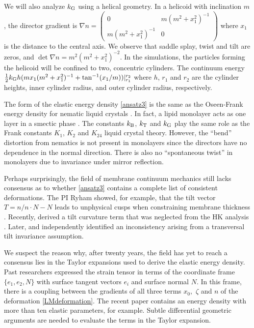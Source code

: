 We will also analyze $k_{\mathrm{G}}$ using a helical geometry. In a helicoid with inclination $m$, the director
gradient is $\nabla n = \begin{pmatrix} 0 & m(m^2+x_1^2)^{-1} \\ m(m^2+x_1^2)^{-1} & 0\end{pmatrix}$ where $x_1$ is the distance to the central
axis. We observe that saddle splay, twist and tilt are zeros, and $\det \nabla n = m^2(m^2+x_1^2)^{-2}$.
In the simulations, the particles forming the helicoid will be confined to two, concentric cylinders. The
continuum energy $\tfrac{1}{2}k_{\mathrm{G}} h(m x_1(m^2+x_1^2)^{-1} + \tan^{-1}(x_1/m)) |_{r_1}^{r_2}$ where $h$, $r_1$ and $r_2$
are the cylinder heights, inner cylinder radius, and outer cylinder radius, respectively. 

The form of the elastic energy density \eqref{ansatz3} is the same as
the Oseen-Frank energy density for nematic liquid crystals \cite{ANDRIENKO2018520,Tran7106}.  In fact,  
a lipid monolayer acts as one layer in a smectic  phase \cite{REYESMATEO1995978,Rangamani20140463,PhysRevLett.113.248102}. 
The constants $k_{\mathrm{B}}$, $k_{\mathrm{T}}$  and $k_{\mathrm{G}}$ play the same role as the Frank constants $K_1$, $K_2$ and $K_{24}$
liquid crystal theory. However, the ``bend'' distortion from nematics  
is not present in monolayers since the directors have no dependence in the normal direction.
There is also no ``spontaneous twist'' in monolayers due to invariance under mirror reflection. 

 Perhaps surprisingly, the field of membrane continuum mechanics still lacks consensus as to
  whether \eqref{ansatz3} contains a complete list of consistent deformations.
  The PI Ryham showed, for example, that the tilt vector $T = n/n\cdot N - N$ leads to unphysical cusps when constraining membrane thickness
 \cite{RyKlYaCo16}.
  Recently, \cite{10.1063/1.4990404} derived a tilt curvature term that was neglected from the HK analysis \cite{Hamm2000}.
  Later, \cite{https://doi.org/10.1039/C9SM02079A} 
  and \cite{10.1103/PhysRevE.102.042406} independently identified an inconsistency \cite{10.1063/1.4990404} arising
  from a transversal tilt invariance assumption. 

  We suspect the reason why, after twenty years, the field has yet to reach a consensus 
  lies in the Taylor expansions used to derive the elastic energy density. 
  Past researchers expressed the strain tensor in
  terms of the coordinate frame $\{e_1, e_2, N\}$ with surface tangent vectors $e_i$ and surface normal $N$.  
  In this frame, there is a coupling between the gradients of all three terms $x_0,$ $\zeta$ and $n$ of the deformation \eqref{LMdeformation}.
  The recent paper \cite{10.1103/PhysRevE.102.042406} contains an energy density with more than ten elastic parameters, for example.
  Subtle differential geometric arguments are needed to evaluate the terms in the Taylor expansion.

